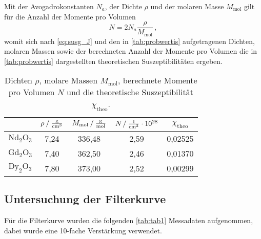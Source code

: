 Mit der Avogadrokonstanten $N_a$, der Dichte $\rho$ und der molaren Masse $M_\text{mol}$ gilt für die Anzahl der Momente pro Volumen
\begin{equation*}
    N = 2 N_a \dfrac{\rho}{M_\text{mol}} \,,
\end{equation*}
womit sich nach \eqref{eq:susg_J} und den in \autoref{tab:probwertis} aufgetragenen Dichten, molaren Massen sowie der berechneten Anzahl der Momente pro Volumen
die in \autoref{tab:probwertis} dargestellten theoretischen Suszeptibilitäten ergeben.

\begin{table}[H]
    \centering
    \caption{Dichten $\rho$, molare Massen $M_\text{mol}$, berechnete Momente pro Volumen $N$ und die theoretische Suszeptibilität $\chi_{\text{theo}}$.}
    \label{tab:probwertis}
    \begin{tabular}{S S[table-format=1.2] S[table-format=3.2] S[table-format=1.2] S}
      \toprule
      {} & {$\rho \mathbin{/} \unit{\frac{\gram}{{\centi\meter}^3}}$} & {$M_\text{mol} \mathbin{/} \unit{\frac{\gram}{\mol}}$} & {$N \mathbin{/} \unit{\frac{1}{{\centi\meter}^3}} \cdot 10^{28}$}&{$\chi_{\text{theo}}$}  \\
      \midrule
      {$\text{Nd}_2\text{O}_3$}         &           7,24          &         336,48          &           2,59     &{0,02525}       \\
      {$\text{Gd}_2\text{O}_3$}         &           7,40          &         362,50          &           2,46     &{0,01370}       \\
      {$\text{Dy}_2\text{O}_3$}         &           7,80          &         373,00          &           2,52     &{0,00299}       \\
      \bottomrule
    \end{tabular}
\end{table}



\subsection{Untersuchung der Filterkurve}

Für die Filterkurve wurden die folgenden \autoref{tab:tab1} Messadaten aufgenommen, dabei wurde eine 10-fache Verstärkung verwendet.

